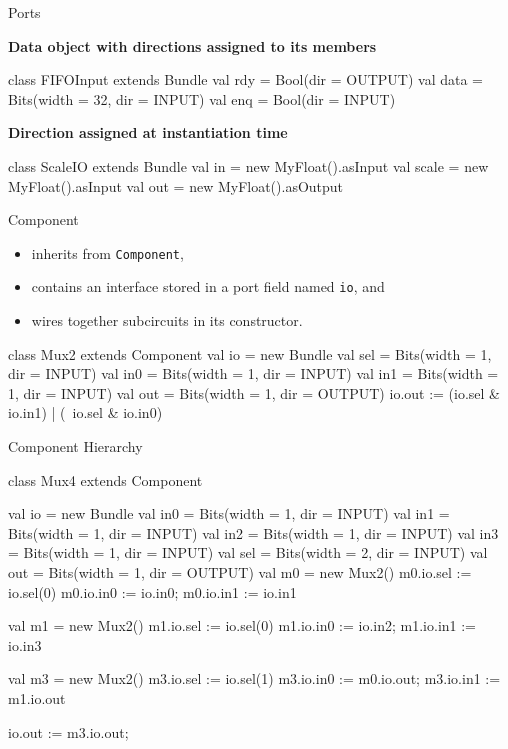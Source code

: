 \documentclass[xcolor=pdflatex,dvipsnames,table]{beamer}
\begin{document}
\begin{frame}[fragile]{Ports}

\textbf{Data object with directions assigned to its members}

\begin{scala}
class FIFOInput extends Bundle {
  val rdy  = Bool(dir = OUTPUT)
  val data = Bits(width = 32, dir = INPUT)
  val enq  = Bool(dir = INPUT)
}
\end{scala}

\textbf{Direction assigned at instantiation time}

\begin{scala}
class ScaleIO extends Bundle {
  val in    = new MyFloat().asInput
  val scale = new MyFloat().asInput
  val out   = new MyFloat().asOutput
}
\end{scala}
\end{frame}

\begin{frame}{Component}

\begin{itemize}
\item inherits from \verb+Component+,
\item contains an interface stored in a port field named \verb+io+, and
\item wires together subcircuits in its constructor.
\end{itemize}

\begin{scala}
class Mux2 extends Component {
  val io = new Bundle{
    val sel = Bits(width = 1, dir = INPUT)
    val in0 = Bits(width = 1, dir = INPUT)
    val in1 = Bits(width = 1, dir = INPUT)
    val out = Bits(width = 1, dir = OUTPUT)
  }
  io.out := (io.sel & io.in1) | (~io.sel & io.in0)
}
\end{scala}

\end{frame}

\begin{frame}{Component Hierarchy}
\begin{scala}
class Mux4 extends Component {
  val io = new Bundle {
    val in0 = Bits(width = 1, dir = INPUT)
    val in1 = Bits(width = 1, dir = INPUT)
    val in2 = Bits(width = 1, dir = INPUT)
    val in3 = Bits(width = 1, dir = INPUT)
    val sel = Bits(width = 2, dir = INPUT)
    val out = Bits(width = 1, dir = OUTPUT)
  }
  val m0 = new Mux2()
  m0.io.sel := io.sel(0) 
  m0.io.in0 := io.in0; m0.io.in1 := io.in1

  val m1 = new Mux2()
  m1.io.sel := io.sel(0)
  m1.io.in0 := io.in2; m1.io.in1 := io.in3

  val m3 = new Mux2()
  m3.io.sel := io.sel(1)
  m3.io.in0 := m0.io.out; m3.io.in1 := m1.io.out

  io.out := m3.io.out;
}
\end{scala}
\end{frame}
\end{document}
